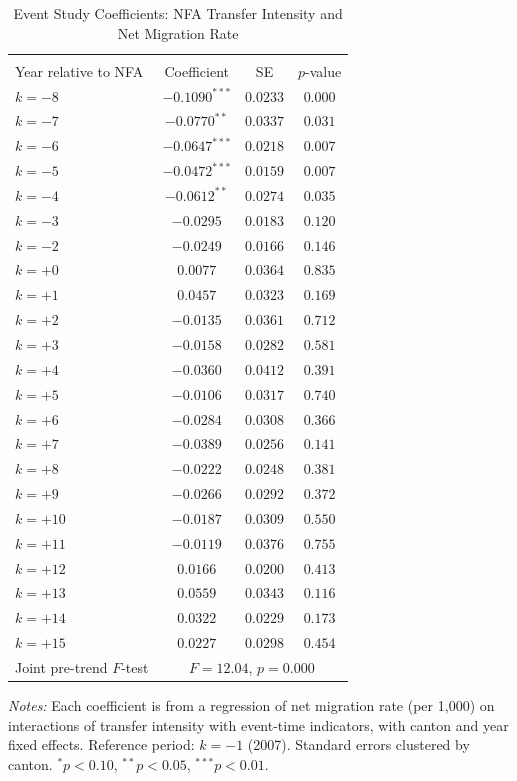 \begin{table}[t]
\centering
\caption{Event Study Coefficients: NFA Transfer Intensity and Net Migration Rate}
\label{tab:eventstudy}
\small
\begin{threeparttable}
\begin{tabular}{lccc}
\hline\hline
\\[-1.8ex]
Year relative to NFA & Coefficient & SE & $p$-value \\
\hline
$k = -8$ & $-0.1090^{***}$ & $0.0233$ & $0.000$ \\
$k = -7$ & $-0.0770^{**}$ & $0.0337$ & $0.031$ \\
$k = -6$ & $-0.0647^{***}$ & $0.0218$ & $0.007$ \\
$k = -5$ & $-0.0472^{***}$ & $0.0159$ & $0.007$ \\
$k = -4$ & $-0.0612^{**}$ & $0.0274$ & $0.035$ \\
$k = -3$ & $-0.0295$ & $0.0183$ & $0.120$ \\
$k = -2$ & $-0.0249$ & $0.0166$ & $0.146$ \\
$k = +0$ & $0.0077$ & $0.0364$ & $0.835$ \\
$k = +1$ & $0.0457$ & $0.0323$ & $0.169$ \\
$k = +2$ & $-0.0135$ & $0.0361$ & $0.712$ \\
$k = +3$ & $-0.0158$ & $0.0282$ & $0.581$ \\
$k = +4$ & $-0.0360$ & $0.0412$ & $0.391$ \\
$k = +5$ & $-0.0106$ & $0.0317$ & $0.740$ \\
$k = +6$ & $-0.0284$ & $0.0308$ & $0.366$ \\
$k = +7$ & $-0.0389$ & $0.0256$ & $0.141$ \\
$k = +8$ & $-0.0222$ & $0.0248$ & $0.381$ \\
$k = +9$ & $-0.0266$ & $0.0292$ & $0.372$ \\
$k = +10$ & $-0.0187$ & $0.0309$ & $0.550$ \\
$k = +11$ & $-0.0119$ & $0.0376$ & $0.755$ \\
$k = +12$ & $0.0166$ & $0.0200$ & $0.413$ \\
$k = +13$ & $0.0559$ & $0.0343$ & $0.116$ \\
$k = +14$ & $0.0322$ & $0.0229$ & $0.173$ \\
$k = +15$ & $0.0227$ & $0.0298$ & $0.454$ \\
\hline
Joint pre-trend $F$-test & \multicolumn{3}{c}{$F = 12.04$, $p = 0.000$} \\
\hline\hline
\end{tabular}
\begin{tablenotes}
\item \textit{Notes:} Each coefficient is from a regression of net migration rate (per 1{,}000) on interactions of transfer intensity with event-time indicators, with canton and year fixed effects. Reference period: $k = -1$ (2007). Standard errors clustered by canton. $^{*}p<0.10$, $^{**}p<0.05$, $^{***}p<0.01$.
\end{tablenotes}
\end{threeparttable}
\end{table}
